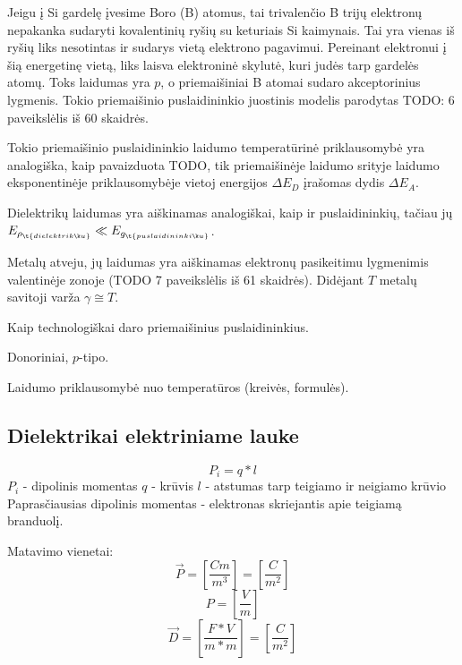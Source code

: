 Jeigu į Si gardelę įvesime Boro (B) atomus, tai trivalenčio B
trijų elektronų nepakanka sudaryti kovalentinių ryšių su
keturiais Si kaimynais. Tai yra vienas iš ryšių liks nesotintas
ir sudarys vietą elektrono pagavimui. Pereinant elektronui į šią
energetinę vietą, liks laisva elektroninė skylutė, kuri judės
tarp gardelės atomų. Toks laidumas yra $p$, o priemaišiniai
B atomai sudaro akceptorinius lygmenis. Tokio priemaišinio puslaidininkio
juostinis modelis parodytas TODO: 6 paveikslėlis iš 60 skaidrės.

Tokio priemaišinio puslaidininkio laidumo temperatūrinė priklausomybė
yra analogiška, kaip pavaizduota TODO, tik priemaišinėje laidumo
srityje laidumo eksponentinėje priklausomybėje vietoj
energijos $\Delta E_{D}$ įrašomas dydis $\Delta E_{A}$.

Dielektrikų laidumas yra aiškinamas analogiškai, kaip ir puslaidininkių,
tačiau jų $E_{\rho_{\t{dielektrikų}}} \ll E_{g_{\t{puslaidininkių}}}$.

Metalų atveju, jų laidumas yra aiškinamas elektronų pasikeitimu lygmenimis
valentinėje zonoje (TODO 7 paveikslėlis iš 61 skaidrės).
Didėjant $T$ metalų savitoji varža $\gamma \cong T$.

\begin{remember}
  \item Kaip technologiškai daro priemaišinius puslaidininkius.
  \item Donoriniai, $p$-tipo.
  \item Laidumo priklausomybė nuo temperatūros (kreivės, formulės).
\end{remember}


\subsection{Dielektrikai elektriniame lauke}

\begin{equation*}
  P_i = q*l
\end{equation*}
$P_i$ - dipolinis momentas
$q$ - krūvis
$l$ - atstumas tarp teigiamo ir neigiamo krūvio
Paprasčiausias dipolinis momentas - elektronas skriejantis apie teigiamą branduolį.

Matavimo vienetai:
\begin{equation*}
  \overrightarrow{P} = [\frac{Cm}{m^3}]=[\frac{C}{m^2}]
\end{equation*}
\begin{equation*}
  P = [\frac{V}{m}]
\end{equation*}
\begin{equation*}
  \overrightarrow{D} = [\frac{F*V}{m*m}]=[\frac{C}{m^2}]
\end{equation*}


